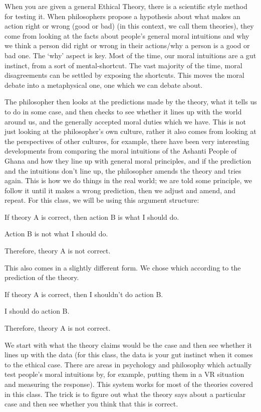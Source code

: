When you are given a general Ethical Theory, there is a scientific style method for testing it. When philosophers propose a hypothesis about what makes an action right or wrong (good or bad) (in this context, we call them theories), they come from looking at the facts about people’s general moral intuitions and why we think a person did right or wrong in their actions/why a person is a good or bad one.  The ‘why’ aspect is key. Most of the time, our moral intuitions are a gut instinct, from a sort of mental-shortcut. The vast majority of the time, moral disagreements can be settled by exposing the shortcuts. This moves the moral debate into a metaphysical one, one which we can debate about. 

The philosopher then looks at the predictions made by the theory, what it tells us to do in some case, and then checks to see whether it lines up with the world around us, and the generally accepted moral duties which we have. This is not just looking at the philosopher's own culture, rather it also comes from looking at the perspectives of other cultures, for example, there have been very interesting developments from comparing the moral intuitions of the Ashanti People of Ghana and how they line up with general moral principles, and if the prediction and the intuitions don't line up, the philosopher amends the theory and tries again. This is how we do things in the real world; we are told some principle, we follow it until it makes a wrong prediction, then we adjust and amend, and repeat. For this class, we will be using this argument structure:
\begin{earg}
    \item[]If theory A is correct, then action B is what I should do.
    \item[]Action B is not what I should do.
    \item[]Therefore, theory A is not correct.
\end{earg}
This also comes in a slightly different form. We chose which according to the prediction of the theory.
\begin{earg}
    \item[]If theory A is correct, then I shouldn't do action B.
    \item[]I should do action B.
    \item[]Therefore, theory A is not correct.
\end{earg}
We start with what the theory claims would be the case and then see whether it lines up with the data (for this class, the data is your gut instinct when it comes to the ethical case. There are areas in psychology and philosophy which actually test people's moral intuitions by, for example, putting them in a VR situation and measuring the response). This system works for most of the theories covered in this class. The trick is to figure out what the theory says about a particular case and then see whether you think that this is correct.

